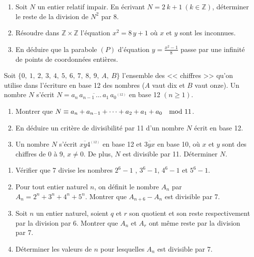 %
\begin{exo}\label{exo:arith-13}
      \begin{enumerate}
            \item Soit $N$ un entier relatif impair. 
                  En \'ecrivant $N = 2\ k + 1 \ (k \in \mathbb{Z})$, d\'eterminer le reste de la division de $N^2$ par 8.
            \item R\'esoudre dans $\mathbb{Z} \times \mathbb{Z}$ 
                  l'\'equation $x^2 = 8 \, y + 1$ o\`u $x$ et $y$ sont les inconnues. 
            \item En d\'eduire que la parabole $(P)$ d'\'equation $y = \frac{x^2 - 1}{8}$ 
                  passe par une infinit\'e de points de coordonn\'ees enti\`eres.
      \end{enumerate}
\end{exo}
%
\begin{exo}\label{exo:arith-14}
      Soit $\{0,\ 1,\ 2,\ 3,\ 4,\ 5,\ 6,\ 7,\ 8,\ 9,\ A,\ B \}$ 
      l'ensemble des << chiffres >> qu'on utilise dans l'\'ecriture en base 12 des nombres ($A$ vaut dix et $B$ vaut onze).
      Un nombre $N$ s'\'ecrit $N = \overline{a_n \, a_{n-1} \, \dots \, a_1 \, a_0}^{_{(12)}}$ en base 12 $(n \geq 1)$.
      \begin{enumerate}
            \item Montrer que $N \equiv a_n + a_{n-1} + \cdots + a_2 + a_1  + a_0 \quad \mathrm{mod}\ 11$.
            \item En d\'eduire un crit\`ere de divisibilit\'e par 11 d'un nombre $N$ \'ecrit en base 12.
            \item Un nombre $N$ s'\'ecrit $\overline{xy4}^{_{(12)}}$ en base 12 et $\overline{3yx}$ en base 10,
                  o\`u $x$ et $y$ sont des chiffres de $0$ \`a $9$, $x \neq 0$.
                  De plus, $N$ est divisible par 11.
                  D\'eterminer $N$.
      \end{enumerate}
\end{exo}
%
\begin{exo}\label{exo:arith-15}
      \begin{enumerate}
            \item V\'erifier que 7 divise les nombres $2^6 -1$ , $3^6 - 1$, $4^6 - 1$ et $5^6 - 1$.
            \item Pour tout entier naturel $n$, on d\'efinit le nombre $A_n$ par $A_n = 2^n + 3^n + 4^n + 5^n$.
                  Montrer que $A_{n+6} - A_n$ est divisible par 7.
            \item Soit $n$ un entier naturel, soient $q$ et $r$ son quotient et son reste respectivement par la division par 6.
                  Montrer que $A_n$ et $A_r$ ont m\^eme reste par la division par 7.
            \item D\'eterminer les valeurs de $n$ pour lesquelles $A_n$ est divisible par 7.
      \end{enumerate}
\end{exo}
